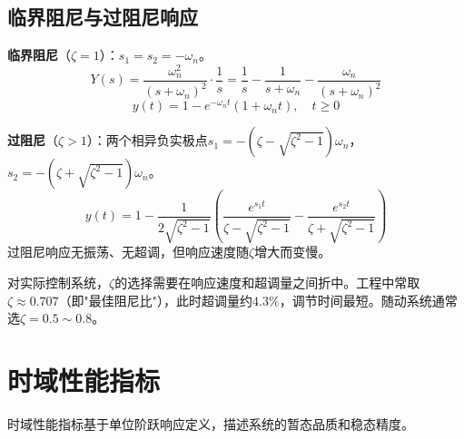 \subsection{临界阻尼与过阻尼响应}

\textbf{临界阻尼}（$\zeta = 1$）：$s_1 = s_2 = -\omega_n$。
\[
Y(s) = \frac{\omega_n^2}{(s+\omega_n)^2} \cdot \frac{1}{s} = \frac{1}{s} - \frac{1}{s+\omega_n} - \frac{\omega_n}{(s+\omega_n)^2}
\]
\[
y(t) = 1 - e^{-\omega_n t}(1 + \omega_n t), \quad t \geq 0
\]

\textbf{过阻尼}（$\zeta > 1$）：两个相异负实极点$s_1 = -(\zeta - \sqrt{\zeta^2-1})\omega_n$，$s_2 = -(\zeta + \sqrt{\zeta^2-1})\omega_n$。
\[
y(t) = 1 - \frac{1}{2\sqrt{\zeta^2-1}}\left( \frac{e^{s_1 t}}{\zeta - \sqrt{\zeta^2-1}} - \frac{e^{s_2 t}}{\zeta + \sqrt{\zeta^2-1}} \right)
\]
过阻尼响应无振荡、无超调，但响应速度随$\zeta$增大而变慢。

\begin{remark}
对实际控制系统，$\zeta$的选择需要在响应速度和超调量之间折中。工程中常取$\zeta \approx 0.707$（即"最佳阻尼比"），此时超调量约$4.3\%$，调节时间最短。随动系统通常选$\zeta = 0.5\sim 0.8$。
\end{remark}

\section{时域性能指标}

时域性能指标基于单位阶跃响应定义，描述系统的暂态品质和稳态精度。

